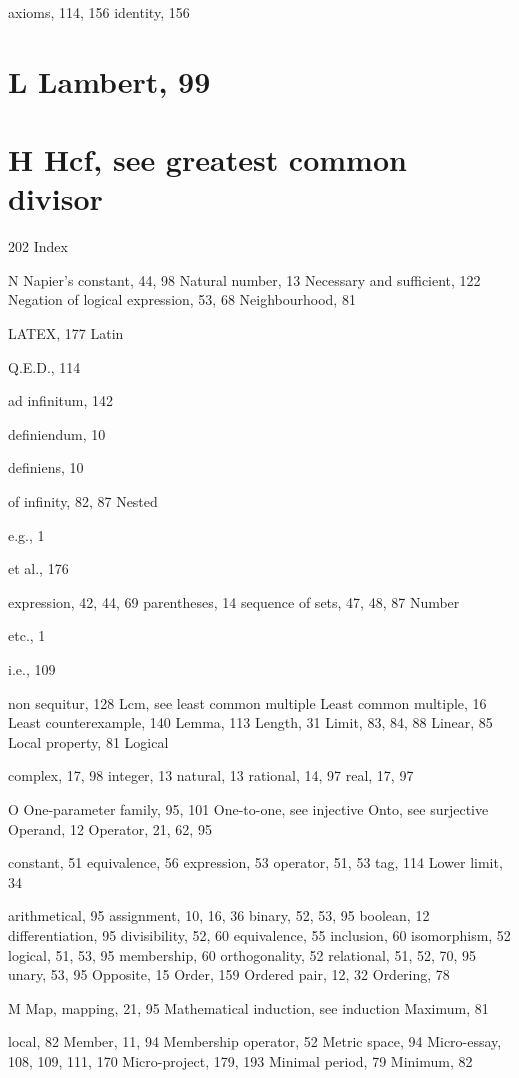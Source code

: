 \documentclass[11pt]{article}
\theoremstyle{plain}
\theoremstyle{definition}
\begin{document}
axioms, 114, 156 identity, 156

\section{L Lambert, 99}

\section{H Hcf, see greatest common divisor}

202 Index

N Napier's constant, 44, 98 Natural number, 13 Necessary and sufficient, 122 Negation of logical expression, 53, 68 Neighbourhood, 81

LATEX, 177 Latin

Q.E.D., 114

ad infinitum, 142

definiendum, 10

definiens, 10

of infinity, 82, 87 Nested

e.g., 1

et al., 176

expression, 42, 44, 69 parentheses, 14 sequence of sets, 47, 48, 87 Number

etc., 1

i.e., 109

non sequitur, 128 Lcm, see least common multiple Least common multiple, 16 Least counterexample, 140 Lemma, 113 Length, 31 Limit, 83, 84, 88 Linear, 85 Local property, 81 Logical

complex, 17, 98 integer, 13 natural, 13 rational, 14, 97 real, 17, 97

O One-parameter family, 95, 101 One-to-one, see injective Onto, see surjective Operand, 12 Operator, 21, 62, 95

constant, 51 equivalence, 56 expression, 53 operator, 51, 53 tag, 114 Lower limit, 34

arithmetical, 95 assignment, 10, 16, 36 binary, 52, 53, 95 boolean, 12 differentiation, 95 divisibility, 52, 60 equivalence, 55 inclusion, 60 isomorphism, 52 logical, 51, 53, 95 membership, 60 orthogonality, 52 relational, 51, 52, 70, 95 unary, 53, 95 Opposite, 15 Order, 159 Ordered pair, 12, 32 Ordering, 78

M Map, mapping, 21, 95 Mathematical induction, see induction Maximum, 81

local, 82 Member, 11, 94 Membership operator, 52 Metric space, 94 Micro-essay, 108, 109, 111, 170 Micro-project, 179, 193 Minimal period, 79 Minimum, 82
\end{document}
